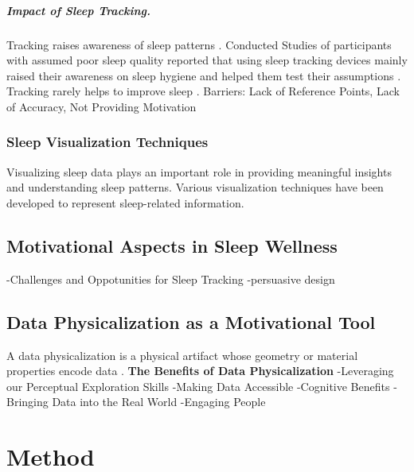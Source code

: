 \documentclass[
  a4paper,  %
  twoside,  %
  bibliography=totoc,
  headsepline,
  cleardoublepage=empty,
  parskip=half,
  draft=false
]{scrbook}
\begin{document}
\paragraph{Impact of Sleep Tracking.}
Tracking raises awareness of sleep patterns \cite{liang_sleep_2016}. Conducted Studies of participants with assumed poor sleep quality reported that using sleep tracking devices mainly raised their awareness on sleep hygiene and helped them test their assumptions \cite{liang_sleep_2016}. Tracking rarely helps to improve sleep \cite{liang_sleep_2016}.
\newline
Barriers: Lack of Reference Points, Lack of Accuracy, Not Providing Motivation \cite{liang_sleep_2016}

\subsection{Sleep Visualization Techniques}

Visualizing sleep data plays an important role in providing meaningful insights and understanding sleep patterns. Various visualization techniques have been developed to represent sleep-related information.
\section{Motivational Aspects in Sleep Wellness}
-Challenges and Oppotunities for Sleep Tracking \cite{liu_bed_2015}
\newline
-persuasive design
\section{Data Physicalization as a Motivational Tool}
A data physicalization is a physical artifact whose geometry or material properties encode data \cite{jansen_opportunities_2015}.
\newline
\newline
\textbf{The Benefits of Data Physicalization}
-Leveraging our Perceptual Exploration Skills
\newline
-Making Data Accessible
\newline
-Cognitive Benefits
\newline
-Bringing Data into the Real World
\newline
-Engaging People


\chapter{Method}
\end{document}
